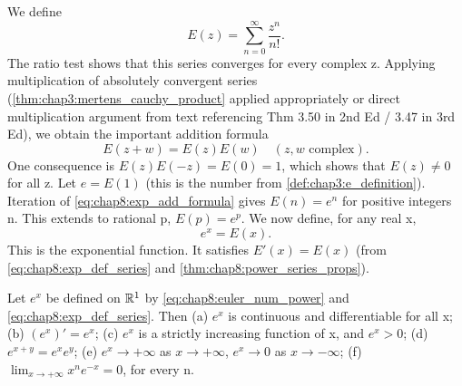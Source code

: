 We define
\begin{equation} \label{eq:chap8:exp_def_series}
  E(z) = \sum_{n=0}^\infty \frac{z^n}{n!}.
\end{equation}
The ratio test shows that this series converges for every complex z.
Applying multiplication of absolutely convergent series
(\autoref{thm:chap3:mertens_cauchy_product} applied appropriately or
  direct multiplication argument from text referencing Thm 3.50 in 2nd
Ed / 3.47 in 3rd Ed), we obtain the important addition formula
\begin{equation} \label{eq:chap8:exp_add_formula}
  E(z+w) = E(z)E(w) \quad (z, w \text{ complex}).
\end{equation}
One consequence is $E(z)E(-z) = E(0) = 1$, which shows that $E(z) \ne
0$ for all z.
Let $e = E(1)$ (this is the number from
\autoref{def:chap3:e_definition}). Iteration of
\eqref{eq:chap8:exp_add_formula} gives $E(n) = e^n$ for positive
integers n. This extends to rational p, $E(p) = e^p$.
We now define, for any real x,
\begin{equation} \label{eq:chap8:euler_num_power}
  e^x = E(x).
\end{equation}
This is the exponential function. It satisfies $E'(x) = E(x)$ (from
\eqref{eq:chap8:exp_def_series} and \autoref{thm:chap8:power_series_props}).

\begin{theorem} %
  \label{thm:chap8:exp_properties}
  Let $e^x$ be defined on $\mathbb{R}^1$ by \eqref{eq:chap8:euler_num_power}
  and \eqref{eq:chap8:exp_def_series}. Then
  (a) $e^x$ is continuous and differentiable for all x;
  (b) $(e^x)' = e^x$;
  (c) $e^x$ is a strictly increasing function of x, and $e^x > 0$;
  (d) $e^{x+y} = e^x e^y$;
  (e) $e^x \to +\infty$ as $x \to +\infty$, $e^x \to 0$ as $x \to -\infty$;
  (f) $\lim_{x \to +\infty} x^n e^{-x} = 0$, for every n.
\end{theorem}

